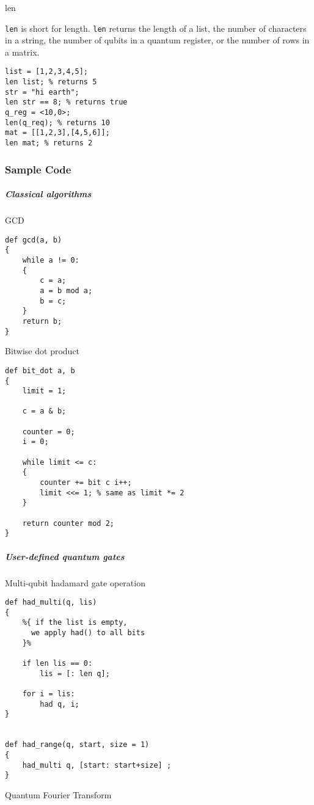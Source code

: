 \documentclass[]{article}
\begin{document}
len

\texttt{len} is short for length. \texttt{len} returns the length of a
list, the number of characters in a string, the number of qubits in a
quantum register, or the number of rows in a matrix.

\begin{verbatim}
list = [1,2,3,4,5];
len list; % returns 5
str = "hi earth";
len str == 8; % returns true
q_reg = <10,0>;
len(q_req); % returns 10
mat = [[1,2,3],[4,5,6]];
len mat; % returns 2
\end{verbatim}

\subsubsection{Sample Code}\label{sample-code}

\subparagraph{Classical algorithms}\label{classical-algorithms}

GCD

\begin{verbatim}
def gcd(a, b)
{
    while a != 0:
    {
        c = a;
        a = b mod a;
        b = c;
    }
    return b;
}
\end{verbatim}

Bitwise dot product

\begin{verbatim}
def bit_dot a, b
{
    limit = 1;

    c = a & b;

    counter = 0;
    i = 0;

    while limit <= c:
    {
        counter += bit c i++;
        limit <<= 1; % same as limit *= 2
    }

    return counter mod 2;
}
\end{verbatim}

\subparagraph{User-defined quantum
gates}\label{user-defined-quantum-gates}

Multi-qubit hadamard gate operation

\begin{verbatim}
def had_multi(q, lis)
{
    %{ if the list is empty, 
      we apply had() to all bits
    }%

    if len lis == 0:
        lis = [: len q];

    for i = lis:
        had q, i;
}


def had_range(q, start, size = 1)
{
    had_multi q, [start: start+size] ;
}
\end{verbatim}

Quantum Fourier Transform
\end{document}
